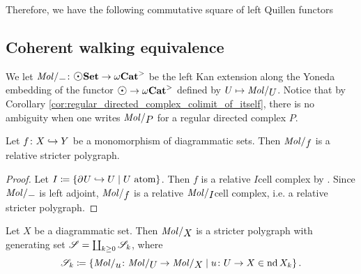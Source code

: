 \noindent Therefore, we have the following commutative square of left Quillen functors
\begin{center}
\end{center}

\subsection{Coherent walking equivalence}

We let \( \molecin{-} \colon \dgmSet \to \somegaCat \) be the left Kan extension along the Yoneda embedding of the functor \( \atom \to \somegaCat \) defined by \( U \mapsto \molecin{U} \).
Notice that by Corollary \ref{cor:regular_directed_complex_colimit_of_itself}, there is no ambiguity when one writes \( \molecin{P} \) for a regular directed complex \( P \).

\begin{lem} \label{lem:molecin_preserves_cofibration}
    Let \( f \colon X \hookrightarrow Y \) be a monomorphism of diagrammatic sets.
    Then \( \molecin{f} \) is a relative stricter polygraph.
\end{lem}
\begin{proof}
    Let \( I \coloneqq \left\{ {\partial_{}^{} U \hookrightarrow U \mid U \text{ atom}} \right\} \).
    Then \( f \) is a relative \( I \)\nbd cell complex by \cite[Remark 2.9]{chanavat2024htpy}.
    Since \( \molecin{-} \) is left adjoint, \( \molecin{f} \) is a relative \( \molecin{I} \)\nbd cell complex, i.e. a relative stricter polygraph.
\end{proof}

\begin{cor} \label{cor:molecin_polygraph_with_basis}
    Let \( X \) be a diagrammatic set. 
    Then \( \molecin{X} \) is a stricter polygraph with generating set \( \mathscr{S} = \coprod_{k \geq 0} \mathscr{S}_k \), where
    \begin{equation*}
        \cls{S}_k \eqdef \set{\molecin{u} \colon \molecin{U} \to \molecin{X} \mid u \colon U \to X \in \gr{k}{\nd X}}.
    \end{equation*}
\end{cor}

